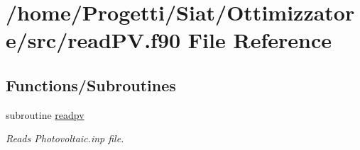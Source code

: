 \hypertarget{read_p_v_8f90}{\section{/home/\-Progetti/\-Siat/\-Ottimizzatore/src/read\-P\-V.f90 File Reference}
\label{read_p_v_8f90}
}
\subsection*{Functions/\-Subroutines}
\begin{DoxyCompactItemize}
\item 
subroutine \hyperlink{read_p_v_8f90_a7da992fc3763c23a4450ff04eb2e49e8}{readpv}
\begin{DoxyCompactList}\small\item\em Reads Photovoltaic.\-inp file. \end{DoxyCompactList}\end{DoxyCompactItemize}


